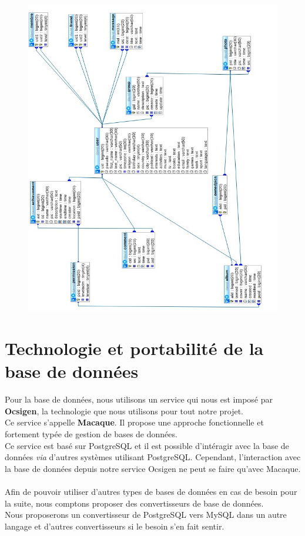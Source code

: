 \documentclass{life-fr}
\begin{document}
\begin{figure}[H]
  \begin{center}
    \includegraphics[width=18cm]{img/imgdb.jpg}
  \end{center}
\end{figure}

\section{Technologie et portabilité de la base de données}

Pour la base de données, nous utilisons un service qui nous est imposé par
\textbf{Ocsigen}, la technologie que nous utilisons pour tout notre projet.\\
Ce service s'appelle \textbf{Macaque}. Il propose une approche fonctionnelle
et fortement typée de gestion de bases de données.\\
Ce service est basé sur PostgreSQL et il est possible d'intéragir avec la
base de données \textit{via} d'autres systèmes utilisant PostgreSQL.
Cependant, l'interaction avec la base de données depuis notre service Ocsigen
ne peut se faire qu'avec Macaque.\\
\\
Afin de pouvoir utiliser d'autres types de bases de données en cas de besoin
pour la suite, nous comptons proposer des convertisseurs de base de données.\\
Nous proposerons un convertisseur de PostgreSQL vers MySQL dans un autre langage et
d'autres convertisseurs si le besoin s'en fait sentir.
\end{document}
